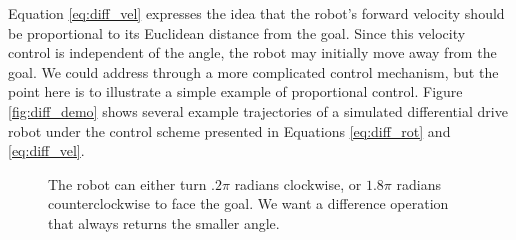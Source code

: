 Equation \ref{eq:diff_vel} expresses the idea that the robot's forward
velocity should be proportional to its Euclidean distance from the
goal.  Since this velocity control is independent of the angle, the
robot may initially move away from the goal.  We could address through
a more complicated control mechanism, but the point here is to
illustrate a simple example of proportional control.  Figure
\ref{fig:diff_demo} shows several example trajectories of a simulated
differential drive robot under the control scheme presented in
Equations \ref{eq:diff_rot} and \ref{eq:diff_vel}.


\begin{figure}[h!]
\begin{center}

\end{center}
\caption{The robot can either turn $.2\pi$ radians clockwise, or $1.8\pi$ radians
  counterclockwise to face the goal. We want a difference operation
  that always returns the smaller angle. }
\label{fig:angle_problem}
\end{figure}



